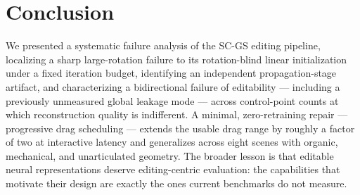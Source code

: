\documentclass[10pt,twocolumn]{article}
\begin{document}
\section{Conclusion}
\label{sec:conclusion}

We presented a systematic failure analysis of the SC-GS editing pipeline,
localizing a sharp large-rotation failure to its rotation-blind linear
initialization under a fixed iteration budget, identifying an independent
propagation-stage artifact, and characterizing a bidirectional failure of
editability --- including a previously unmeasured global leakage mode ---
across control-point counts at which reconstruction quality is indifferent. A
minimal, zero-retraining repair --- progressive drag scheduling --- extends the
usable drag range by roughly a factor of two at interactive latency and
generalizes across eight scenes with organic, mechanical, and unarticulated
geometry. The broader lesson is that editable neural
representations deserve editing-centric evaluation: the capabilities that
motivate their design are exactly the ones current benchmarks do not measure.
\end{document}
